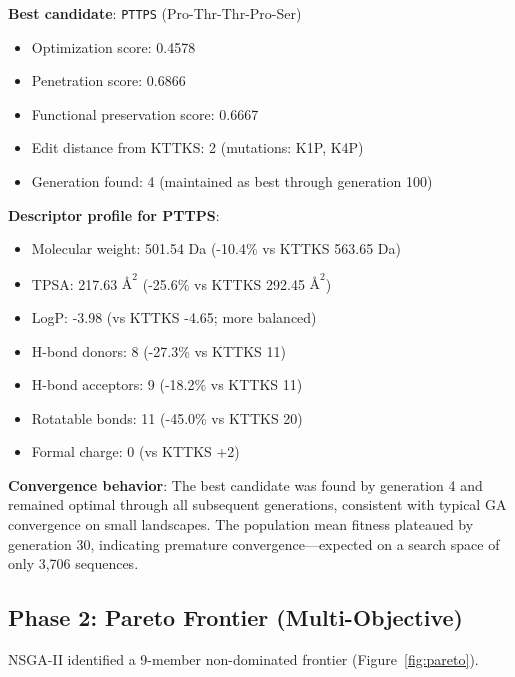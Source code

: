 \documentclass[11pt,a4paper]{article}
\begin{document}
\textbf{Best candidate}: \texttt{PTTPS} (Pro-Thr-Thr-Pro-Ser)
\begin{itemize}
  \item Optimization score: 0.4578
  \item Penetration score: 0.6866
  \item Functional preservation score: 0.6667
  \item Edit distance from KTTKS: 2 (mutations: K1P, K4P)
  \item Generation found: 4 (maintained as best through generation 100)
\end{itemize}

\textbf{Descriptor profile for PTTPS}:
\begin{itemize}
  \item Molecular weight: 501.54 Da (-10.4\% vs KTTKS 563.65 Da)
  \item TPSA: 217.63 $\text{\AA}^2$ (-25.6\% vs KTTKS 292.45 $\text{\AA}^2$)
  \item LogP: -3.98 (vs KTTKS -4.65; more balanced)
  \item H-bond donors: 8 (-27.3\% vs KTTKS 11)
  \item H-bond acceptors: 9 (-18.2\% vs KTTKS 11)
  \item Rotatable bonds: 11 (-45.0\% vs KTTKS 20)
  \item Formal charge: 0 (vs KTTKS +2)
\end{itemize}

\textbf{Convergence behavior}: The best candidate was found by generation 4 and remained optimal through all subsequent generations, consistent with typical GA convergence on small landscapes. The population mean fitness plateaued by generation 30, indicating premature convergence---expected on a search space of only 3,706 sequences.

\subsection{Phase 2: Pareto Frontier (Multi-Objective)}

NSGA-II identified a 9-member non-dominated frontier (Figure~\ref{fig:pareto}).
\end{document}
